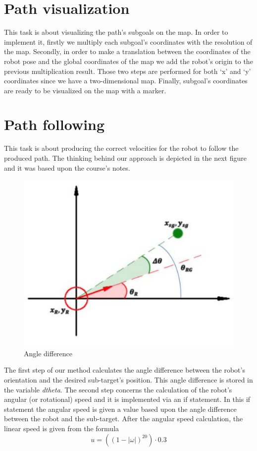 \documentclass[letterpaper,12pt]{article}
\begin{document}
\section{Path visualization}


\vspace{2mm} %

This task is about visualizing the path’s subgoals on the map. In order to implement it, firstly we multiply each subgoal’s coordinates with the resolution of the map. Secondly, in order to make a translation between the coordinates of the robot pose and the global coordinates of the map we add the robot’s origin to the previous multiplication result. Those two steps are performed for both ‘x’ and ‘y’ coordinates since we have a two-dimensional map. Finally, subgoal’s coordinates are ready to be visualized on the map with a marker.

\section{Path following}


\vspace{2mm} %

This task is about producing the correct velocities for the robot to follow the produced path. The thinking behind our approach is depicted in the next figure and it was based upon the course’s notes.

\newpage

\begin{figure}[!htb]
	\centering
	\includegraphics[width=.4\textwidth]{images/angle.png}
	\caption{Angle difference}
	\label{fig:angle}
\end{figure}

The first step of our method calculates the angle difference between the robot’s orientation and the desired sub-target’s position. This angle difference is stored in the variable \textit{dtheta}. The second step concerns the calculation of the robot’s angular (or rotational) speed and it is implemented via an if statement. In this if statement the angular speed is given a value based upon the angle difference between the robot and the sub-target. After the angular speed calculation, the linear speed is given from the formula \[u = ((1-|\omega|)^{20})\cdot0.3\]
\end{document}
